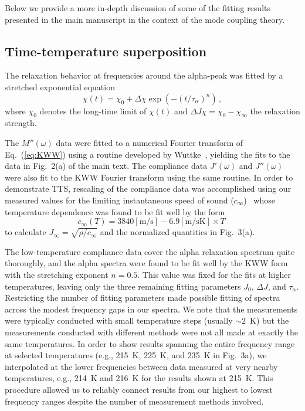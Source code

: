 \documentclass[reprint,showpacs,amsmath,amssymb,aip,jcp]{revtex4-1}
\begin{document}
Below we provide a more in-depth discussion of some of the fitting
results presented in the main manuscript in the context of the mode
coupling theory.


\subsection{Time-temperature superposition}

The relaxation behavior at frequencies around the alpha-peak was
fitted by a stretched exponential equation
\begin{equation}\label{eq:KWW}
  \chi(t)=\chi_0+\Delta \chi \exp \left(-(t/\tau_{\alpha})^n\right)\,,
\end{equation}
where $\chi_0$ denotes the long-time limit of $\chi(t)$ and $\Delta
J\chi=\chi_0-\chi_\infty$ the relaxation strength.

The $M''(\omega)$ data were fitted to a numerical Fourier transform of
Eq.~(\ref{eq:KWW}) using a routine developed by
Wuttke~\cite{sWuttke2012}, yielding the fits to the data in Fig.\ 2(a)
of the main text. The compliance data $J'(\omega)$ and $J''(\omega)$
were also fit to the KWW Fourier transform using the same routine. In
order to demonstrate TTS, rescaling of the compliance data was
accomplished using our measured values for the limiting instantaneous
speed of sound ($c_\infty$)~\cite{sKlieber2013} whose temperature
dependence was found to be fit well by the form
\begin{equation}\label{cinf_DC704}
  c_\infty (T)=3840[\textrm{m/s}] - 6.9[\textrm{m/sK}]\times T \;
\end{equation}
to calculate $J_{\infty} = \sqrt{\rho/c_{\infty}}$ and the normalized
quantities in Fig.~3(a).

The low-temperature compliance data cover the alpha relaxation
spectrum quite thoroughly, and the alpha spectra were found to be fit
well by the KWW form with the stretching exponent $n = 0.5$. This
value was fixed for the fits at higher temperatures, leaving only the
three remaining fitting parameters $J_0$, $\Delta J$, and
$\tau_{\alpha}$. Restricting the number of fitting parameters made
possible fitting of spectra across the modest frequency gaps in our
spectra. We note that the measurements were typically conducted with
small temperature steps (usually $\sim 2$~K) but the measurements
conducted with different methods were not all made at exactly the same
temperatures. In order to show results spanning the entire frequency
range at selected temperatures (e.g., 215~K, 225~K, and 235~K in
Fig.~3a), we interpolated at the lower frequencies between data
measured at very nearby temperatures, e.g., 214~K and 216~K for the
results shown at 215~K. This procedure allowed us to reliably connect
results from our highest to lowest frequency ranges despite the number
of measurement methods involved.
\end{document}
